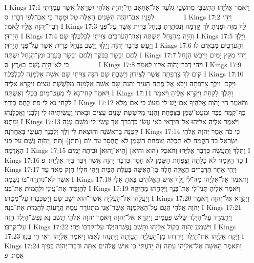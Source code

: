 I Kings 17:1	וַיֹּאמֶר אֵלִיָּהוּ הַתִּשְׁבִּי מִתֹּשָׁבֵי גִלְעָד אֶל־אַחְאָב חַי־יְהֹוָה אֱלֹהֵי יִשְׂרָאֵל אֲשֶׁר עָמַדְתִּי לְפָנָיו אִם־יִהְיֶה הַשָּׁנִים הָאֵלֶּה טַל וּמָטָר כִּי אִם־לְפִי דְבָרִי׃ {ס}        
I Kings 17:2	וַיְהִי דְבַר־יְהֹוָה אֵלָיו לֵאמֹר׃
I Kings 17:3	לֵךְ מִזֶּה וּפָנִיתָ לְּךָ קֵדְמָה וְנִסְתַּרְתָּ בְּנַחַל כְּרִית אֲשֶׁר עַל־פְּנֵי הַיַּרְדֵּן׃
I Kings 17:4	וְהָיָה מֵהַנַּחַל תִּשְׁתֶּה וְאֶת־הָעֹרְבִים צִוִּיתִי לְכַלְכֶּלְךָ שָׁם׃
I Kings 17:5	וַיֵּלֶךְ וַיַּעַשׂ כִּדְבַר יְהֹוָה וַיֵּלֶךְ וַיֵּשֶׁב בְּנַחַל כְּרִית אֲשֶׁר עַל־פְּנֵי הַיַּרְדֵּן׃
I Kings 17:6	וְהָעֹרְבִים מְבִאִים לוֹ לֶחֶם וּבָשָׂר בַּבֹּקֶר וְלֶחֶם וּבָשָׂר בָּעָרֶב וּמִן־הַנַּחַל יִשְׁתֶּה׃
I Kings 17:7	וַיְהִי מִקֵּץ יָמִים וַיִּיבַשׁ הַנָּחַל כִּי לֹא־הָיָה גֶשֶׁם בָּאָרֶץ׃ {ס}        
I Kings 17:8	וַיְהִי דְבַר־יְהֹוָה אֵלָיו לֵאמֹר׃
I Kings 17:9	קוּם לֵךְ צָרְפַתָה אֲשֶׁר לְצִידוֹן וְיָשַׁבְתָּ שָׁם הִנֵּה צִוִּיתִי שָׁם אִשָּׁה אַלְמָנָה לְכַלְכְּלֶךָ׃
I Kings 17:10	וַיָּקם  וַיֵּלֶךְ צָרְפַתָה וַיָּבֹא אֶל־פֶּתַח הָעִיר וְהִנֵּה־שָׁם אִשָּׁה אַלְמָנָה מְקֹשֶׁשֶׁת עֵצִים וַיִּקְרָא אֵלֶיהָ וַיֹּאמַר קְחִי־נָא לִי מְעַט־מַיִם בַּכְּלִי וְאֶשְׁתֶּה׃
I Kings 17:11	וַתֵּלֶךְ לָקַחַת וַיִּקְרָא אֵלֶיהָ וַיֹּאמַר לִקְחִי־נָא לִי פַּת־לֶחֶם בְּיָדֵךְ׃
I Kings 17:12	וַתֹּאמֶר חַי־יְהֹוָה אֱלֹהֶיךָ אִם־יֶשׁ־לִי מָעוֹג כִּי אִם־מְלֹא כַף־קֶמַח בַּכַּד וּמְעַט־שֶׁמֶן בַּצַּפָּחַת וְהִנְנִי מְקֹשֶׁשֶׁת שְׁנַיִם עֵצִים וּבָאתִי וַעֲשִׂיתִיהוּ לִי וְלִבְנִי וַאֲכַלְנֻהוּ וָמָתְנוּ׃
I Kings 17:13	וַיֹּאמֶר אֵלֶיהָ אֵלִיָּהוּ אַל־תִּירְאִי בֹּאִי עֲשִׂי כִדְבָרֵךְ אַךְ עֲשִׂי־לִי־מִשָּׁם עֻגָה קְטַנָּה בָרִאשֹׁנָה וְהוֹצֵאת לִי וְלָךְ וְלִבְנֵךְ תַּעֲשִׂי בָּאַחֲרֹנָה׃
I Kings 17:14	כִּי כֹה אָמַר יְהֹוָה אֱלֹהֵי יִשְׂרָאֵל כַּד הַקֶּמַח לֹא תִכְלָה וְצַפַּחַת הַשֶּׁמֶן לֹא תֶחְסָר עַד יוֹם (תתן) [תֵּת־]יְהֹוָה גֶּשֶׁם עַל־פְּנֵי הָאֲדָמָה׃
I Kings 17:15	וַתֵּלֶךְ וַתַּעֲשֶׂה כִּדְבַר אֵלִיָּהוּ וַתֹּאכַל (הוא והיא) [הִיא־וָהוּא] וּבֵיתָהּ יָמִים׃
I Kings 17:16	כַּד הַקֶּמַח לֹא כָלָתָה וְצַפַּחַת הַשֶּׁמֶן לֹא חָסֵר כִּדְבַר יְהֹוָה אֲשֶׁר דִּבֶּר בְּיַד אֵלִיָּהוּ׃ {פ}
I Kings 17:17	וַיְהִי אַחַר הַדְּבָרִים הָאֵלֶּה חָלָה בֶּן־הָאִשָּׁה בַּעֲלַת הַבָּיִת וַיְהִי חלְיוֹ חָזָק מְאֹד עַד אֲשֶׁר לֹא־נוֹתְרָה־בּוֹ נְשָׁמָה׃
I Kings 17:18	וַתֹּאמֶר אֶל־אֵלִיָּהוּ מַה־לִּי וָלָךְ אִישׁ הָאֱלֹהִים בָּאתָ אֵלַי לְהַזְכִּיר אֶת־עֲוֺנִי וּלְהָמִית אֶת־בְּנִי׃
I Kings 17:19	וַיֹּאמֶר אֵלֶיהָ תְּנִי־לִי אֶת־בְּנֵךְ וַיִּקָּחֵהוּ מֵחֵיקָהּ וַיַּעֲלֵהוּ אֶל־הָעֲלִיָּה אֲשֶׁר־הוּא יֹשֵׁב שָׁם וַיַּשְׁכִּבֵהוּ עַל־מִטָּתוֹ׃
I Kings 17:20	וַיִּקְרָא אֶל־יְהֹוָה וַיֹּאמַר יְהֹוָה אֱלֹהָי הֲגַם עַל־הָאַלְמָנָה אֲשֶׁר־אֲנִי מִתְגּוֹרֵר עִמָּהּ הֲרֵעוֹתָ לְהָמִית אֶת־בְּנָהּ׃
I Kings 17:21	וַיִּתְמֹדֵד עַל־הַיֶּלֶד שָׁלֹשׁ פְּעָמִים וַיִּקְרָא אֶל־יְהֹוָה וַיֹּאמַר יְהֹוָה אֱלֹהָי תָּשׁב נָא נֶפֶשׁ־הַיֶּלֶד הַזֶּה עַל־קִרְבּוֹ׃
I Kings 17:22	וַיִּשְׁמַע יְהֹוָה בְּקוֹל אֵלִיָּהוּ וַתָּשׁב נֶפֶשׁ־הַיֶּלֶד עַל־קִרְבּוֹ וַיֶּחִי׃
I Kings 17:23	וַיִּקַּח אֵלִיָּהוּ אֶת־הַיֶּלֶד וַיֹּרִדֵהוּ מִן־הָעֲלִיָּה הַבַּיְתָה וַיִּתְּנֵהוּ לְאִמּוֹ וַיֹּאמֶר אֵלִיָּהוּ רְאִי חַי בְּנֵךְ׃
I Kings 17:24	וַתֹּאמֶר הָאִשָּׁה אֶל־אֵלִיָּהוּ עַתָּה זֶה יָדַעְתִּי כִּי אִישׁ אֱלֹהִים אָתָּה וּדְבַר־יְהֹוָה בְּפִיךָ אֱמֶת׃ {פ}
